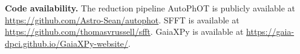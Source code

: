 \documentclass[11pt,a4paper]{article}
\begin{document}
\vspace{1em}
\noindent\textbf{Code availability.} The reduction pipeline AutoPhOT is publicly available at \url{https://github.com/Astro-Sean/autophot}. SFFT is available at \url{https://github.com/thomasvrussell/sfft}. GaiaXPy is available at \url{https://gaia-dpci.github.io/GaiaXPy-website/}.


\end{document}
